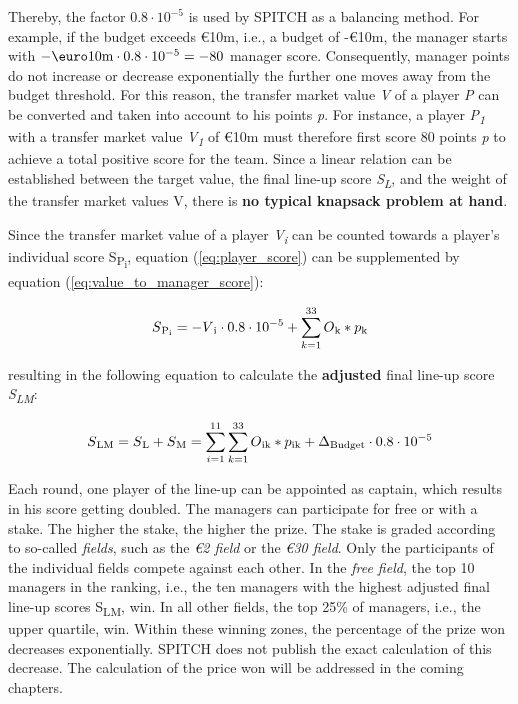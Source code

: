 Thereby, the factor $0.8\cdot10^{-5}$ is used by SPITCH as a balancing method. \parencite[cf.][]{spitch_rules_nodate} For example, if the budget exceeds €10m, i.e., a budget of -€10m, the manager starts with $-\textup{\euro}10\textup{m}\cdot0.8\cdot10^{-5} = -80$ manager score. Consequently, manager points do not increase or decrease exponentially the further one moves away from the budget threshold. For this reason, the transfer market value \emph{V} of a player \emph{P} can be converted and taken into account to his points \emph{p}. For instance, a player \emph{P\textsubscript{1}} with a transfer market value \emph{V\textsubscript{1}} of €10m must therefore first score 80 points \emph{p} to achieve a total positive score for the team. Since a linear relation can be established between the target value, the final line-up score \emph{S\textsubscript{L}}, and the weight of the transfer market values V, there is \textbf{no typical knapsack problem at hand}.

Since the transfer market value of a player \emph{V\textsubscript{i}} can be counted towards a player's individual score S\textsubscript{P\textsubscript{i}}, equation (\ref{eq:player_score}) can be supplemented by equation (\ref{eq:value_to_manager_score}):

\begin{equation}
    S\textsubscript{P\textsubscript{i}} = -V\textsubscript{i}\cdot0.8\cdot10^{-5} + \sum_{k=1}^{33} O\textsubscript{k} * p\textsubscript{k}
    \label{eq:player_score_with_value}
\end{equation}

resulting in the following equation to calculate the \textbf{adjusted} final line-up score \emph{S\textsubscript{LM}}:

\begin{equation}
    S\textsubscript{LM} = S\textsubscript{L} + S\textsubscript{M} = \sum_{i=1}^{11} \sum_{k=1}^{33} O\textsubscript{ik} * p\textsubscript{ik} + \Delta \textsubscript{Budget}\cdot0.8\cdot10^{-5}
    \label{eq:final_score_with_ms}
\end{equation}

Each round, one player of the line-up can be appointed as captain, which results in his score getting doubled. The managers can participate for free or with a stake. The higher the stake, the higher the prize. The stake is graded according to so-called \emph{fields}, such as the \emph{€2 field} or the \emph{€30 field}. Only the participants of the individual fields compete against each other. In the \emph{free field}, the top 10 managers in the ranking, i.e., the ten managers with the highest adjusted final line-up scores {S\textsubscript{LM}}, win. In all other fields, the top 25\% of managers, i.e., the upper quartile, win. Within these winning zones, the percentage of the prize won decreases exponentially. SPITCH does not publish the exact calculation of this decrease. The calculation of the price won will be addressed in the coming chapters.
